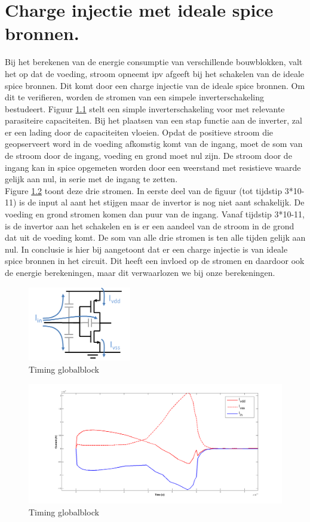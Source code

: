 \chapter{Charge injectie met ideale spice bronnen.}
\label{app:chargeinj}
Bij het berekenen van de energie consumptie van verschillende bouwblokken, valt het op dat de voeding, stroom opneemt ipv afgeeft bij het schakelen van de ideale spice bronnen. Dit komt door een charge injectie van de ideale spice bronnen. Om dit te verifieren, worden de stromen van een simpele inverterschakeling bestudeert. Figuur \ref{fig:chargeinj_inv} stelt een simple inverterschakeling voor met relevante parasiteire capaciteiten. Bij het plaatsen van een stap functie aan de inverter, zal er een lading door de capaciteiten vloeien. Opdat de positieve stroom die geopserveert word in de voeding afkomstig komt van de ingang, moet de som van de stroom door de ingang, voeding en grond moet nul zijn. De stroom door de ingang kan in spice opgemeten worden door een weerstand met resistieve waarde gelijk aan nul, in serie met de ingang te zetten.\\
Figure \ref{fig:chargeinj_cur} toont deze drie stromen. In eerste deel van de figuur (tot tijdstip 3*10-11) is de input al aant het stijgen maar de invertor is nog niet aant schakelijk. De voeding en grond stromen komen dan puur van de ingang. Vanaf tijdstip 3*10-11, is de invertor aan het schakelen en is er een aandeel van de stroom in de grond dat uit de voeding komt. De som van alle drie stromen is ten alle tijden gelijk aan nul.
In conclusie is hier bij aangetoont dat er een charge injectie is van ideale spice bronnen in het circuit. Dit heeft een invloed op de stromen en daardoor ook de energie berekeningen, maar dit verwaarlozen we bij onze berekeningen.

\begin{figure}[!ht]
  \centering
  \includegraphics[width=0.4\textwidth]{../fig/hfdst-chargeinj-inv.png}
  \caption{Timing globalblock}
  \label{fig:chargeinj_inv}
\end{figure}

\begin{figure}[!ht]
  \centering
  \includegraphics[width=\textwidth]{../fig/hfdst-chargeinj-currents.png}
  \caption{Timing globalblock}
  \label{fig:chargeinj_cur}
\end{figure}